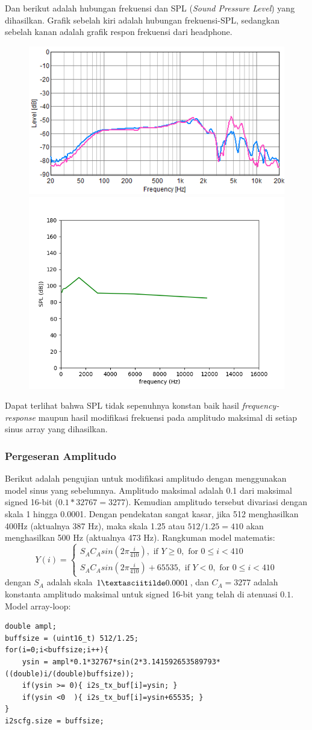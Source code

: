 \documentclass[12pt,]{article}
\begin{document}
	Dan berikut adalah hubungan	frekuensi dan SPL (\textit{Sound Pressure Level}) yang dihasilkan.
	Grafik sebelah kiri adalah hubungan frekuensi-SPL,
	sedangkan sebelah kanan adalah grafik respon frekuensi dari headphone.
	\begin{figure}[H]
		\centering
		\includegraphics[width=0.45\linewidth]{result/day_1/FreqResp_JBL}
		\includegraphics[width=0.45\linewidth]{result/analisa/freq_spl}
	\end{figure}
	Dapat terlihat bahwa SPL tidak sepenuhnya konstan baik hasil \textit{frequency-response} 
	maupun hasil modifikasi frekuensi pada amplitudo maksimal di setiap sinus array yang dihasilkan.
	
	\newpage
	\subsubsection{Pergeseran Amplitudo}
	Berikut adalah pengujian untuk modifikasi amplitudo dengan menggunakan model sinus yang sebelumnya.
	Amplitudo maksimal adalah 0.1 dari maksimal signed 16-bit ($0.1*32767=3277$).
	Kemudian amplitudo tersebut divariasi dengan skala 1 hingga 0.0001.
	Dengan pendekatan sangat kasar, jika 512 menghasilkan 400Hz (aktualnya 387 Hz), maka skala 1.25 atau $512/1.25=410$
	akan menghasilkan 500 Hz (aktualnya 473 Hz).
	Rangkuman model matematis:
	\[
	Y(i) = 
	\begin{cases}
	S_A C_A sin(2 \pi \frac{i}{410}), \text{ if } Y \geq 0, \text{ for } 0 \leq i < 410\\ 
	S_A C_A sin(2 \pi \frac{i}{410})+65535, \text{ if } Y < 0, \text{ for } 0 \leq i < 410
	\end{cases}
	\]
	dengan $S_A$ adalah skala $1 \textasciitilde 0.0001$, dan $C_A=3277$ adalah konstanta amplitudo maksimal 
	untuk signed 16-bit yang telah di atenuasi $0.1$. 
	Model array-loop:
	\begin{verbatim}
double ampl;	
buffsize = (uint16_t) 512/1.25;
for(i=0;i<buffsize;i++){
	ysin = ampl*0.1*32767*sin(2*3.141592653589793*((double)i/(double)buffsize));
	if(ysin >= 0){ i2s_tx_buf[i]=ysin; }
	if(ysin <0  ){ i2s_tx_buf[i]=ysin+65535; }
}
i2scfg.size = buffsize;
	\end{verbatim}
	
\end{document}
